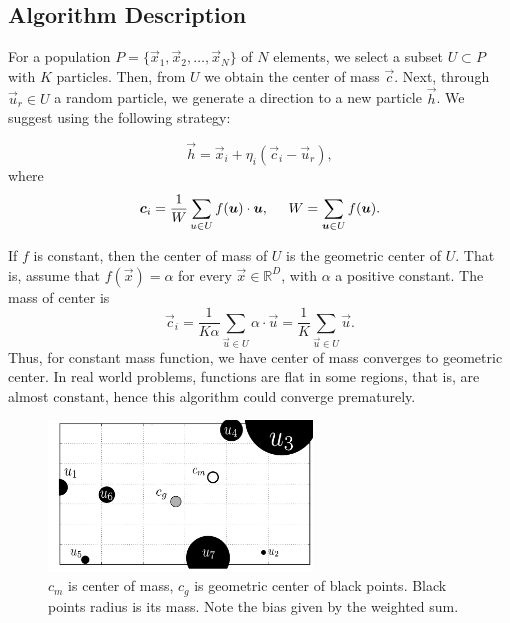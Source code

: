 \documentclass[graybox]{svmult}
\begin{document}
\subsection{Algorithm Description} %
\label{sub:algorithm_description}

For a population $P = \{ \vec{x}_1, \vec{x}_2, \ldots, \vec{x}_{N} \} $ of $N$ 
elements, we select a subset $U \subset P $ with $K$ particles. Then, from $U$ we 
obtain the center of mass $\vec{c}$. Next, through $\vec{u}_r \in U$ a random particle, 
we generate a direction to a new particle $ \vec{h}$. We suggest using the following strategy:

\begin{equation}
	\vec{h} = \vec{x}_i + \eta _{i} ( \vec{c}_i - \vec{u}_{r} ),
	\label{eqn:vcu}
\end{equation}
%
where 
%
\begin{equation}
	\vec{c}_i = \dfrac{1} {W} \sum_{u \in U} f(\vec{u}) \cdot \vec{u} , 
			\hspace{0.5cm} 
			W = \sum_{ \vec{u} \in U} f(\vec{u}).
	\label{eqn:center}
\end{equation}

\begin{note}
	If $f$ is constant, then the center of mass of $U$ is the geometric center of 
	$U$. That is, assume that $f(\vec{x}) = \alpha$ for every $\vec{x} \in \mathbb{R}^D$, 
	with $\alpha$ a positive constant. The mass of center is
%
\begin{equation}
	\vec{c}_i = \dfrac{1} {K \alpha} \sum_{ \vec{u} \in U} \alpha \cdot \vec{u} =  \dfrac{1} {K } \sum_{\vec{u} \in U} \vec{u}.
	\label{eqn:center-geometric}
\end{equation}
%
Thus, for constant mass function, we have center of mass converges to geometric 
center. In real world problems, functions are flat in some regions, that is, are 
almost constant, hence this algorithm could converge prematurely.
\end{note}

\begin{figure}[!ht]
	\sidecaption
	\includegraphics[width=7cm]{img/masses.pdf}
	\caption{$c_m$ is center of mass, $c_g$ is geometric center of black points. 
	Black points radius is its mass. Note the bias given by the weighted sum.}
	\label{fig:masses}       %
\end{figure}
\end{document}
